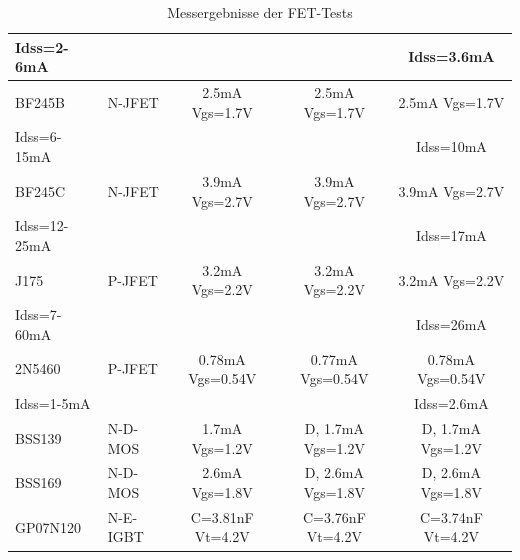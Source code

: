 \begin{table}[H]
\begin{center}
\begin{tabular}{| l | l | c | c | c |}
Idss=2-6mA   &         &                  &                  & Idss=3.6mA      \\
    \hline
BF245B       & N-JFET  & 2.5mA Vgs=1.7V   & 2.5mA Vgs=1.7V   & 2.5mA Vgs=1.7V \\
Idss=6-15mA  &         &                  &                  & Idss=10mA      \\
    \hline
BF245C       & N-JFET  & 3.9mA Vgs=2.7V   & 3.9mA Vgs=2.7V   & 3.9mA Vgs=2.7V \\
Idss=12-25mA &         &                  &                  & Idss=17mA    \\
    \hline
J175        & P-JFET   & 3.2mA Vgs=2.2V   & 3.2mA Vgs=2.2V   & 3.2mA Vgs=2.2V \\
Idss=7-60mA &          &                  &                  & Idss=26mA      \\
    \hline
2N5460      & P-JFET   & 0.78mA Vgs=0.54V & 0.77mA Vgs=0.54V & 0.78mA Vgs=0.54V \\
Idss=1-5mA  &          &                  &                  & Idss=2.6mA       \\
    \hline
BSS139      & N-D-MOS  & 1.7mA Vgs=1.2V  & D, 1.7mA Vgs=1.2V & D, 1.7mA Vgs=1.2V \\
    \hline
BSS169      & N-D-MOS  & 2.6mA Vgs=1.8V  & D, 2.6mA Vgs=1.8V & D, 2.6mA Vgs=1.8V \\
    \hline
GP07N120    & N-E-IGBT & C=3.81nF Vt=4.2V & C=3.76nF Vt=4.2V & C=3.74nF Vt=4.2V \\
    \hline
    \end{tabular}
  \end{center}
  \caption{Messergebnisse der FET-Tests}
  \label{tab:mos} 
\end{table}
